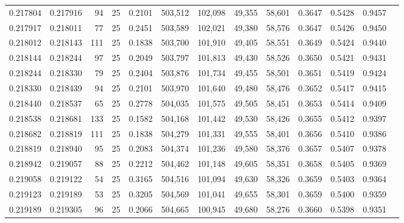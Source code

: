\begin{tabular}{rrrrrrrrrrrrr}
0.217804 & 0.217916 &    94 &  25 &                                     0.2101 & 503,512 & 102,098 &  49,355 &  58,601 & 0.3647 & 0.5428 & 0.9457 \\
0.217917 & 0.218011 &    77 &  25 &                                     0.2451 & 503,589 & 102,021 &  49,380 &  58,576 & 0.3647 & 0.5426 & 0.9450 \\
0.218012 & 0.218143 &   111 &  25 &                                     0.1838 & 503,700 & 101,910 &  49,405 &  58,551 & 0.3649 & 0.5424 & 0.9440 \\
0.218144 & 0.218244 &    97 &  25 &                                     0.2049 & 503,797 & 101,813 &  49,430 &  58,526 & 0.3650 & 0.5421 & 0.9431 \\
0.218244 & 0.218330 &    79 &  25 &                                     0.2404 & 503,876 & 101,734 &  49,455 &  58,501 & 0.3651 & 0.5419 & 0.9424 \\
0.218330 & 0.218439 &    94 &  25 &                                     0.2101 & 503,970 & 101,640 &  49,480 &  58,476 & 0.3652 & 0.5417 & 0.9415 \\
0.218440 & 0.218537 &    65 &  25 &                                     0.2778 & 504,035 & 101,575 &  49,505 &  58,451 & 0.3653 & 0.5414 & 0.9409 \\
0.218538 & 0.218681 &   133 &  25 &                                     0.1582 & 504,168 & 101,442 &  49,530 &  58,426 & 0.3655 & 0.5412 & 0.9397 \\
0.218682 & 0.218819 &   111 &  25 &                                     0.1838 & 504,279 & 101,331 &  49,555 &  58,401 & 0.3656 & 0.5410 & 0.9386 \\
0.218819 & 0.218940 &    95 &  25 &                                     0.2083 & 504,374 & 101,236 &  49,580 &  58,376 & 0.3657 & 0.5407 & 0.9378 \\
0.218942 & 0.219057 &    88 &  25 &                                     0.2212 & 504,462 & 101,148 &  49,605 &  58,351 & 0.3658 & 0.5405 & 0.9369 \\
0.219058 & 0.219122 &    54 &  25 &                                     0.3165 & 504,516 & 101,094 &  49,630 &  58,326 & 0.3659 & 0.5403 & 0.9364 \\
0.219123 & 0.219189 &    53 &  25 &                                     0.3205 & 504,569 & 101,041 &  49,655 &  58,301 & 0.3659 & 0.5400 & 0.9359 \\
0.219189 & 0.219305 &    96 &  25 &                                     0.2066 & 504,665 & 100,945 &  49,680 &  58,276 & 0.3660 & 0.5398 & 0.9351 \\

\end{tabular}
